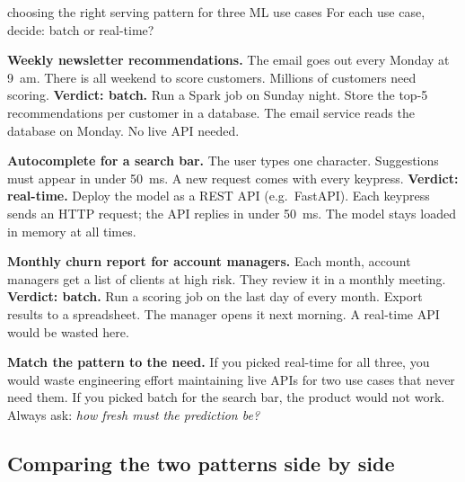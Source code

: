 \documentclass[a4paper,11pt]{article}
\begin{document}
\begin{worked}{choosing the right serving pattern for three ML use cases}
For each use case, decide: batch or real-time?

\begin{steps}
  \item \textbf{Weekly newsletter recommendations.}
        The email goes out every Monday at 9~am. There is all weekend to
        score customers. Millions of customers need scoring.
        \textbf{Verdict: batch.}
        Run a Spark job on Sunday night. Store the top-5 recommendations
        per customer in a database. The email service reads the database
        on Monday. No live API needed.

  \item \textbf{Autocomplete for a search bar.}
        The user types one character. Suggestions must appear in under 50~ms.
        A new request comes with every keypress.
        \textbf{Verdict: real-time.}
        Deploy the model as a REST API (e.g.\ FastAPI). Each keypress
        sends an HTTP request; the API replies in under 50~ms. The model
        stays loaded in memory at all times.

  \item \textbf{Monthly churn report for account managers.}
        Each month, account managers get a list of clients at high risk.
        They review it in a monthly meeting.
        \textbf{Verdict: batch.}
        Run a scoring job on the last day of every month. Export results
        to a spreadsheet. The manager opens it next morning. A real-time
        API would be wasted here.

  \item \textbf{Match the pattern to the need.}
        If you picked real-time for all three, you would waste engineering
        effort maintaining live APIs for two use cases that never need them.
        If you picked batch for the search bar, the product would not work.
        Always ask: \emph{how fresh must the prediction be?}
\end{steps}
\end{worked}

\subsection{Comparing the two patterns side by side}
\end{document}
